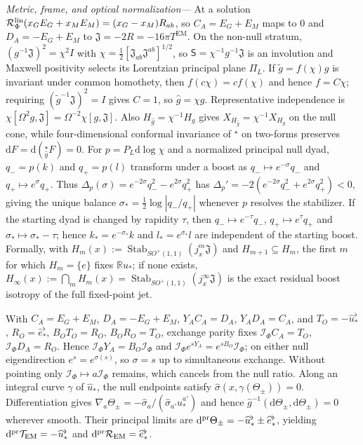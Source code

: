 \documentclass[aps,prl,reprint]{revtex4-2}
\newcommand{\EM}{\mathrm{EM}}
\newcommand{\dd}{\mathrm d}
\begin{document}
\textit{Metric, frame, and optical normalization---}
At a solution $\mathcal R^{\rm lin}_\Phi(x_GE_G+x_ME_M)=(x_G-x_M)R_{ab}$, so $C_A=E_G+E_M$ maps to $0$ and $D_A=-E_G+E_M$ to $\mathfrak J=-2R=-16\pi T^{\EM}$. On the non-null stratum, $(g^{-1}\mathfrak J)^2=\chi^2I$ with $\chi=\tfrac12[\mathfrak J_{ab}\mathfrak J^{ab}]^{1/2}$, so $\mathsf S=\chi^{-1}g^{-1}\mathfrak J$ is an involution and Maxwell positivity selects its Lorentzian principal plane $\Pi_L$. If $\widetilde g=f(\chi)g$ is invariant under common homothety, then $f(c\chi)=cf(\chi)$ and hence $f=C\chi$; requiring $(\widetilde g^{-1}\mathfrak J)^2=I$ gives $C=1$, so $\widehat g=\chi g$. Representative independence is $\chi[\Omega^2g,\mathfrak J]=\Omega^{-2}\chi[g,\mathfrak J]$. Also $H_{\widehat g}=\chi^{-1}H_g$ gives $X_{H_{\widehat g}}=\chi^{-1}X_{H_g}$ on the null cone, while four-dimensional conformal invariance of ${}^\star$ on two-forms preserves $\dd F=\dd({}^\star_{\widehat g}F)=0$. For $p=P_L\dd\log\chi$ and a normalized principal null dyad, $q_-=p(k)$ and $q_+=p(l)$ transform under a boost as $q_-\mapsto e^{-\sigma}q_-$ and $q_+\mapsto e^\sigma q_+$. Thus $\Delta_p(\sigma)=e^{-2\sigma}q_-^2-e^{2\sigma}q_+^2$ has $\Delta_p'=-2(e^{-2\sigma}q_-^2+e^{2\sigma}q_+^2)<0$, giving the unique balance $\sigma_*=\tfrac12\log|q_-/q_+|$ whenever $p$ resolves the stabilizer. If the starting dyad is changed by rapidity $\tau$, then $q_-\mapsto e^{-\tau}q_-$, $q_+\mapsto e^{\tau}q_+$ and $\sigma_*\mapsto\sigma_*-\tau$; hence $k_*=e^{-\sigma_*}k$ and $l_*=e^{\sigma_*}l$ are independent of the starting boost. Formally, with $H_m(x):=\operatorname{Stab}_{SO^+(1,1)}(j_x^m\mathfrak J)$ and $H_{m+1}\subseteq H_m$, the first $m$ for which $H_m=\{e\}$ fixes $\mathbb Ru_*$; if none exists, $H_\infty(x):=\bigcap_mH_m(x)=\operatorname{Stab}_{SO^+(1,1)}(j_x^\infty\mathfrak J)$ is the exact residual boost isotropy of the full fixed-point jet.

With $C_A=E_G+E_M$, $D_A=-E_G+E_M$, $Y_AC_A=D_A$, $Y_AD_A=C_A$, and $T_O=-\widehat u_*^\flat$, $R_O=\widehat e_*^\flat$, $B_OT_O=R_O$, $B_OR_O=T_O$, exchange parity fixes $\mathcal I_\Phi C_A=T_O$, $\mathcal I_\Phi D_A=R_O$. Hence $\mathcal I_\Phi Y_A=B_O\mathcal I_\Phi$ and $\mathcal I_\Phi e^{sY_A}=e^{sB_O}\mathcal I_\Phi$; on either null eigendirection $e^s=e^{\sigma(s)}$, so $\sigma=s$ up to simultaneous exchange. Without pointing only $\mathcal I_\Phi\mapsto a\mathcal I_\Phi$ remains, which cancels from the null ratio. Along an integral curve $\gamma$ of $\widehat u_*$, the null endpoints satisfy $\widehat\sigma(x,\gamma(\Theta_\pm))=0$. Differentiation gives $\nabla_a\Theta_\pm=-\widehat\sigma_a/(\widehat\sigma_{a'}\widehat u_*^{a'})$ and hence $\widehat g^{-1}(\dd\Theta_\pm,\dd\Theta_\pm)=0$ wherever smooth. Their principal limits are $\dd^{\rm pr}\Theta_\pm=-\widehat u_*^\flat\pm\widehat e_*^\flat$, yielding $\dd^{\rm pr}\mathcal T_{\EM}=-\widehat u_*^\flat$ and $\dd^{\rm pr}\mathcal R_{\EM}=\widehat e_*^\flat$.
\end{document}
